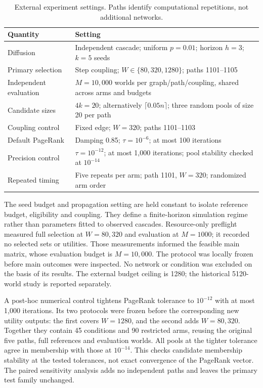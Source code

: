 \documentclass[smallextended]{svjour3}
\begin{document}
\begin{table}[htbp]
\caption{External experiment settings. Paths identify computational repetitions, not additional networks.}\label{tab:settings}
\begin{tabularx}{\linewidth}{lX}
\toprule
Quantity & Setting \\
\midrule
Diffusion & Independent cascade; uniform $p=0.01$; horizon $h=3$; $k=5$ seeds \\
Primary selection & Step coupling; $W\in\{80,320,1280\}$; paths 1101--1105 \\
Independent evaluation & $M=10,000$ worlds per graph/path/coupling, shared across arms and budgets \\
Candidate sizes & $4k=20$; alternatively $\lceil0.05n\rceil$; three random pools of size 20 per path \\
Coupling control & Fixed edge; $W=320$; paths 1101--1103 \\
Default PageRank & Damping 0.85; $\tau=10^{-6}$; at most 100 iterations \\
Precision control & $\tau=10^{-12}$; at most 1,000 iterations; pool stability checked at $10^{-14}$ \\
Repeated timing & Five repeats per arm; path 1101, $W=320$; randomized arm order \\
\bottomrule
\end{tabularx}
\end{table}

The seed budget and propagation setting are held constant to isolate reference budget, eligibility and coupling. They define a finite-horizon simulation regime rather than parameters fitted to observed cascades. Resource-only preflight measured full selection at $W=80,320$ and evaluation at $M=1000$; it recorded no selected sets or utilities. Those measurements informed the feasible main matrix, whose evaluation budget is $M=10,000$. The protocol was locally frozen before main outcomes were inspected. No network or condition was excluded on the basis of its results. The external budget ceiling is 1280; the historical 5120-world study is reported separately.

A post-hoc numerical control tightens PageRank tolerance to $10^{-12}$ with at most 1,000 iterations. Its two protocols were frozen before the corresponding new utility outputs: the first covers $W=1280$, and the second adds $W=80,320$. Together they contain 45 conditions and 90 restricted arms, reusing the original five paths, full references and evaluation worlds. All pools at the tighter tolerance agree in membership with those at $10^{-14}$. This checks candidate membership stability at the tested tolerances, not exact convergence of the PageRank vector. The paired sensitivity analysis adds no independent paths and leaves the primary test family unchanged.
\end{document}
